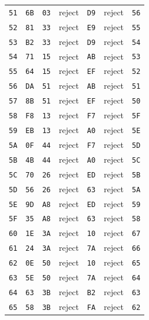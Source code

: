 \begin{longtable}{lllllll}
\texttt{51} & \texttt{6B} & \texttt{03} & reject & \texttt{D9} & reject & \texttt{56}\\
\texttt{52} & \texttt{81} & \texttt{33} & reject & \texttt{E9} & reject & \texttt{55}\\
\texttt{53} & \texttt{B2} & \texttt{33} & reject & \texttt{D9} & reject & \texttt{54}\\
\texttt{54} & \texttt{71} & \texttt{15} & reject & \texttt{AB} & reject & \texttt{53}\\
\texttt{55} & \texttt{64} & \texttt{15} & reject & \texttt{EF} & reject & \texttt{52}\\
\texttt{56} & \texttt{DA} & \texttt{51} & reject & \texttt{AB} & reject & \texttt{51}\\
\texttt{57} & \texttt{8B} & \texttt{51} & reject & \texttt{EF} & reject & \texttt{50}\\
\texttt{58} & \texttt{F8} & \texttt{13} & reject & \texttt{F7} & reject & \texttt{5F}\\
\texttt{59} & \texttt{EB} & \texttt{13} & reject & \texttt{A0} & reject & \texttt{5E}\\
\texttt{5A} & \texttt{0F} & \texttt{44} & reject & \texttt{F7} & reject & \texttt{5D}\\
\texttt{5B} & \texttt{4B} & \texttt{44} & reject & \texttt{A0} & reject & \texttt{5C}\\
\texttt{5C} & \texttt{70} & \texttt{26} & reject & \texttt{ED} & reject & \texttt{5B}\\
\texttt{5D} & \texttt{56} & \texttt{26} & reject & \texttt{63} & reject & \texttt{5A}\\
\texttt{5E} & \texttt{9D} & \texttt{A8} & reject & \texttt{ED} & reject & \texttt{59}\\
\texttt{5F} & \texttt{35} & \texttt{A8} & reject & \texttt{63} & reject & \texttt{58}\\
\texttt{60} & \texttt{1E} & \texttt{3A} & reject & \texttt{10} & reject & \texttt{67}\\
\texttt{61} & \texttt{24} & \texttt{3A} & reject & \texttt{7A} & reject & \texttt{66}\\
\texttt{62} & \texttt{0E} & \texttt{50} & reject & \texttt{10} & reject & \texttt{65}\\
\texttt{63} & \texttt{5E} & \texttt{50} & reject & \texttt{7A} & reject & \texttt{64}\\
\texttt{64} & \texttt{63} & \texttt{3B} & reject & \texttt{B2} & reject & \texttt{63}\\
\texttt{65} & \texttt{58} & \texttt{3B} & reject & \texttt{FA} & reject & \texttt{62}\\

\end{longtable}
